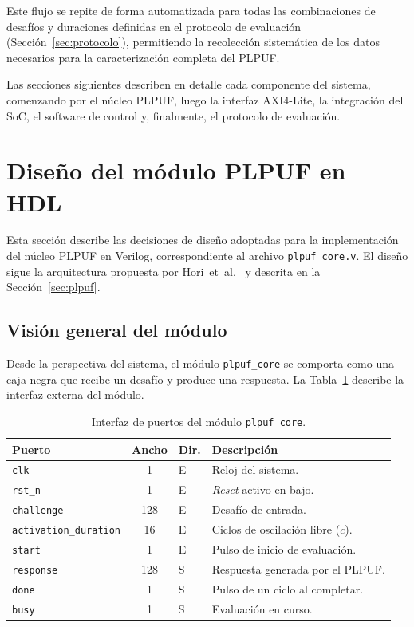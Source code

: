 Este flujo se repite de forma automatizada para todas las combinaciones de
desafíos y duraciones definidas en el protocolo de evaluación
(Sección~\ref{sec:protocolo}), permitiendo la recolección sistemática de los
datos necesarios para la caracterización completa del PLPUF.

Las secciones siguientes describen en detalle cada componente del sistema,
comenzando por el núcleo PLPUF, luego la interfaz AXI4-Lite, la integración
del SoC, el software de control y, finalmente, el protocolo de evaluación.

\section{Diseño del módulo PLPUF en HDL}
\label{sec:diseno_plpuf}

Esta sección describe las decisiones de diseño adoptadas para la
implementación del núcleo PLPUF en Verilog, correspondiente al archivo
\texttt{plpuf\_core.v}. El diseño sigue la arquitectura propuesta por
Hori~et~al.~\cite{hori_2011_pseudolfsr} y descrita en la
Sección~\ref{sec:plpuf}.

\subsection{Visión general del módulo}
\label{sec:plpuf_overview}

Desde la perspectiva del sistema, el módulo \texttt{plpuf\_core} se comporta
como una caja negra que recibe un desafío y produce una respuesta. La
Tabla~\ref{tab:plpuf_ports} describe la interfaz externa del módulo.

\begin{table}[htbp]
\centering
\caption{Interfaz de puertos del módulo \texttt{plpuf\_core}.}
\label{tab:plpuf_ports}
\begin{tabular}{lclp{7cm}}
\hline
\textbf{Puerto} & \textbf{Ancho} & \textbf{Dir.} & \textbf{Descripción} \\
\hline
\texttt{clk}                  & 1   & E & Reloj del sistema. \\
\texttt{rst\_n}               & 1   & E & \textit{Reset} activo en bajo. \\
\texttt{challenge}            & 128 & E & Desafío de entrada. \\
\texttt{activation\_duration} & 16  & E & Ciclos de oscilación libre ($c$). \\
\texttt{start}                & 1   & E & Pulso de inicio de evaluación. \\
\texttt{response}             & 128 & S & Respuesta generada por el PLPUF. \\
\texttt{done}                 & 1   & S & Pulso de un ciclo al completar. \\
\texttt{busy}                 & 1   & S & Evaluación en curso. \\
\hline
\end{tabular}
\end{table}

